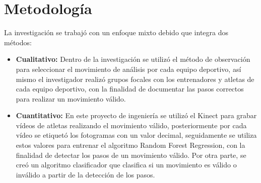 \chapter{Metodolog\'ia}
La investigaci\'on se trabaj\'o con un enfoque mixto debido que integra dos m\'etodos:
\begin{itemize}
	\item \textbf{Cualitativo:} Dentro de la investigaci\'on se utiliz\'o el m\'etodo de observaci\'on para seleccionar el movimiento de an\'alisis por cada equipo deportivo, as\'i mismo el investigador realiz\'o grupos focales con los entrenadores y atletas de cada equipo deportivo, con la finalidad de documentar las pasos correctos para realizar un movimiento v\'alido.
	\item \textbf{Cuantitativo:} En este proyecto de ingenier\'ia se utiliz\'o el Kinect para grabar v\'ideos de atletas realizando el movimiento v\'alido, posteriormente por cada v\'ideo se etiquet\'o los fotogramas con un valor decimal, seguidamente se utiliza estos valores para entrenar el algoritmo Random Forest Regression, con la finalidad de detectar los pasos de un movimiento v\'alido. Por otra parte, se cre\'o un algoritmo clasificador que clasifica si un movimiento es v\'alido o inv\'alido a partir de la detecci\'on de los pasos.
\end{itemize}



